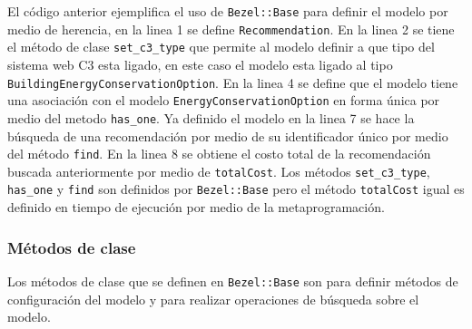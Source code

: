 El código anterior ejemplifica el uso de \texttt{Bezel::Base} para definir el modelo
por medio de herencia, en la linea 1 se define \texttt{Recommendation}. En la linea 2
se tiene el método de clase \texttt{set\_c3\_type} que permite al modelo definir
a que tipo del sistema web C3 esta ligado,  en este caso el modelo esta ligado al
tipo \texttt{BuildingEnergyConservationOption}. En la linea 4 se define que el modelo
tiene una asociación con el modelo \texttt{EnergyConservationOption} en forma única
por medio del metodo \texttt{has\_one}. Ya definido el modelo en la linea 7 se 
hace la búsqueda de una recomendación por medio de su identificador único por medio
del método \texttt{find}. En la linea 8 se obtiene el costo total de la recomendación
buscada anteriormente por medio de \texttt{totalCost}. Los métodos
\texttt{set\_c3\_type}, \texttt{has\_one} y \texttt{find} son definidos por
\texttt{Bezel::Base} pero el método \texttt{totalCost} igual es definido en tiempo
de ejecución por medio de la metaprogramación.

% 

\subsubsection{Métodos de clase}

Los métodos de clase que se definen en \texttt{Bezel::Base} son para
definir métodos de configuración del modelo y para realizar operaciones
de búsqueda sobre el modelo.



